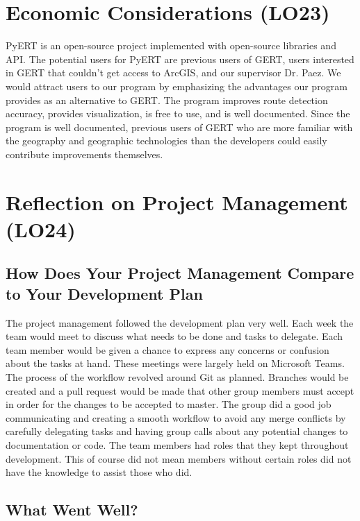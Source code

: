 \documentclass{article}
\begin{document}
 

\section{Economic Considerations (LO23)}

PyERT is an open-source project implemented with open-source libraries and API. The potential users for PyERT are previous users of GERT, users interested in GERT that couldn't get access to ArcGIS, and our supervisor Dr. Paez. We would attract users to our program by emphasizing the advantages our program provides as an alternative to GERT. The program improves route detection accuracy, provides visualization, is free to use, and is well documented. Since the program is well documented, previous users of GERT who are more familiar with the geography and geographic technologies than the developers could easily contribute improvements themselves.

\section{Reflection on Project Management (LO24)}

\subsection{How Does Your Project Management Compare to Your Development Plan}

The project management followed the development plan very well. Each week the team would meet to discuss what needs to be done and tasks to delegate. Each team member would be given a chance to express any concerns or confusion about the tasks at hand. These meetings were largely held on Microsoft Teams. The process of the workflow revolved around Git as planned. Branches would be created and a pull request would be made that other group members must accept in order for the changes to be accepted to master. The group did a good job communicating and creating a smooth workflow to avoid any merge conflicts by carefully delegating tasks and having group calls about any potential changes to documentation or code. The team members had roles that they kept throughout development. This of course did not mean members without certain roles did not have the knowledge to assist those who did. 

\subsection{What Went Well?}
\end{document}
